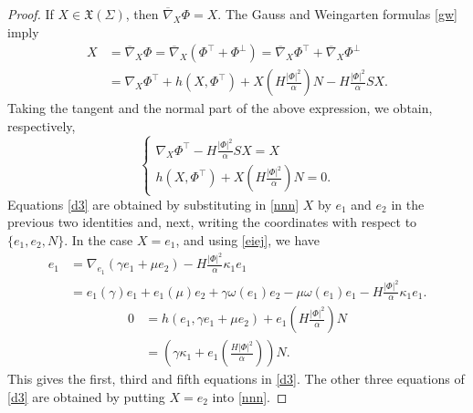\documentclass[a4paper,12pt]{amsart}
\theoremstyle{definition}
\begin{document}
\begin{proof} 
 If $X\in\mathfrak{X}(\Sigma)$, then   $\overline{\nabla}_X\Phi=X$. The Gauss and
Weingarten formulas \eqref{gw} imply 
\begin{equation*}
\begin{split}
    X&=\overline{\nabla}_{X}\Phi=\overline{\nabla}_{X}(\Phi^{\top}+\Phi^{\perp})=\overline{\nabla}_{X} \Phi^{\top}+\overline{\nabla}_X\Phi^{\perp}\\
    &={\nabla}_{X}\Phi^{\top}+h(X,\Phi^{\top})+X( H\frac{|\Phi|^2}{\alpha})N- H\frac{|\Phi|^2}{\alpha} SX.
\end{split}
\end{equation*}
Taking the tangent and the normal part of the above expression, we obtain, respectively,
\begin{equation}\label{nnn} 
    \left\{
    \begin{array}{ll}
        {\nabla}_{X}\Phi^{\top}-H\frac{|\Phi|^2}{\alpha}SX=X\\
        h(X, \Phi^{\top})+X(H\frac{|\Phi|^2}{\alpha})N=0.
    \end{array}
    \right.
\end{equation}
Equations \eqref{d3} are obtained by substituting in \eqref{nnn} $X$ by $e_1$ and   $e_2$ in the previous two identities and, next, writing the  coordinates with respect to $\{e_1,e_2,N\}$. In the case $X=e_1$, and using \eqref{eiej}, we have
\begin{equation*} 
    \begin{array}{ll}
       e_1&=  {\nabla}_{e_1}(\gamma e_1+\mu e_2)-H\frac{|\Phi|^2}{\alpha}\kappa_1 e_1\\
     & =e_1(\gamma)e_1+e_1(\mu)e_2+\gamma \omega(e_1)e_2-\mu\omega(e_1)e_1-H\frac{|\Phi|^2}{\alpha}\kappa_1 e_1.
     \end{array}
\end{equation*}
\begin{equation*} 
    \begin{array}{ll}
       0&= h(e_1,\gamma e_1+\mu e_2)+e_1(H\frac{|\Phi|^2}{\alpha})N\\
       &=\left(\gamma\kappa_1+e_1\left(\frac{ H|\Phi|^2}{\alpha}\right)\right)N.
    \end{array}
\end{equation*}
This gives the first, third and fifth equations in \eqref{d3}. The other three equations of \eqref{d3} are obtained by putting $X=e_2$ into \eqref{nnn}.
\end{proof}

\end{document}

